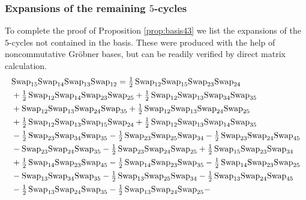 \documentclass[12pt,dvipsnames,accepted=2016-08-18,a4paper,onecolumn]{quantumarticle}
\numberwithin{equation}{section}
\theoremstyle{definition}
\begin{document}
\subsubsection{Expansions of the remaining $5$-cycles} \label{sssec:5-cyc}
To complete the proof of Proposition \ref{prop:basis43} we list the expansions of the $5$-cycles not contained in the basis.
These were produced with the help of noncommutative Gr\"obner bases, but can be readily verified by direct matrix calculation.
\begin{align*}
    &\textnormal{Swap}_{15}   \textnormal{Swap}_{14}   \textnormal{Swap}_{13}   \textnormal{Swap}_{12} = 
    \tfrac12\,\textnormal{Swap}_{12} \textnormal{Swap}_{15} \textnormal{Swap}_{23} \textnormal{Swap}_{24} \\ &
    + \tfrac12\,\textnormal{Swap}_{12} \textnormal{Swap}_{14} \textnormal{Swap}_{23} \textnormal{Swap}_{25} 
     + \tfrac12\,\textnormal{Swap}_{12} \textnormal{Swap}_{13} \textnormal{Swap}_{34} \textnormal{Swap}_{35} \\ &
    + \textnormal{Swap}_{12} \textnormal{Swap}_{13} \textnormal{Swap}_{24} \textnormal{Swap}_{35} 
    + \tfrac12\,\textnormal{Swap}_{12} \textnormal{Swap}_{13} \textnormal{Swap}_{24} \textnormal{Swap}_{25} \\ &
     + \tfrac12\,\textnormal{Swap}_{12} \textnormal{Swap}_{13} \textnormal{Swap}_{15} \textnormal{Swap}_{24} 
    + \tfrac12\,\textnormal{Swap}_{12} \textnormal{Swap}_{13} \textnormal{Swap}_{14} \textnormal{Swap}_{35} \\ &
    - \tfrac12\,\textnormal{Swap}_{23} \textnormal{Swap}_{34} \textnormal{Swap}_{35} 
    - \tfrac12\,\textnormal{Swap}_{23} \textnormal{Swap}_{25} \textnormal{Swap}_{34} -
        \tfrac12\,\textnormal{Swap}_{23} \textnormal{Swap}_{24} \textnormal{Swap}_{45} \\ & - \textnormal{Swap}_{23} \textnormal{Swap}_{24} \textnormal{Swap}_{35}  - \tfrac12\,\textnormal{Swap}_{23} \textnormal{Swap}_{24} \textnormal{Swap}_{25} + \tfrac12\,\textnormal{Swap}_{15} \textnormal{Swap}_{23} \textnormal{Swap}_{34} \\ & +
        \tfrac12\,\textnormal{Swap}_{14} \textnormal{Swap}_{23} \textnormal{Swap}_{45} - \tfrac12\,\textnormal{Swap}_{14} \textnormal{Swap}_{23} \textnormal{Swap}_{35} - \tfrac12\,\textnormal{Swap}_{14} \textnormal{Swap}_{23} \textnormal{Swap}_{25}\\ &  - \textnormal{Swap}_{13} \textnormal{Swap}_{34} \textnormal{Swap}_{35}  -
        \tfrac12\,\textnormal{Swap}_{13} \textnormal{Swap}_{25} \textnormal{Swap}_{34} - \tfrac12\,\textnormal{Swap}_{13} \textnormal{Swap}_{24} \textnormal{Swap}_{45} \\ & - \tfrac12\,\textnormal{Swap}_{13} \textnormal{Swap}_{24} \textnormal{Swap}_{35}  - \tfrac12\,\textnormal{Swap}_{13} \textnormal{Swap}_{24} \textnormal{Swap}_{25} -

\end{align*}
\end{document}
